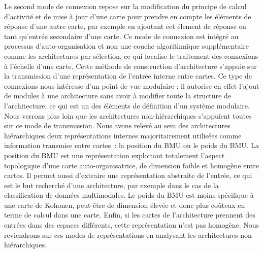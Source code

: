 \documentclass[../main]{subfiles}
\begin{document}
Le second mode de connexion repose sur la modification du principe de calcul d'activité et de mise à jour d'une carte pour prendre en compte les éléments de réponse d'une autre carte, par exemple en ajoutant cet élement de réponse en tant qu'entrée secondaire d'une carte.
Ce mode de connexion est intégré au processus d'auto-organisation et non une couche algorithmique supplémentaire comme les architectures par sélection, ce qui localise le traitement des connexions à l'échelle d'une carte. 
Cette méthode de construction d'architecture s'appuie sur la transmission d'une représentation de l'entrée interne entre cartes.
Ce type de connexions nous intéresse d'un point de vue modulaire : il autorise en effet l'ajout de modules à une architecture sans avoir à modifier toute la structure de l'architecture, ce qui est un des éléments de définition d'un système modulaire.
Nous verrons plus loin que les architectures non-hiérarchiques s'appuient toutes sur ce mode de transmission.
Nous avons relevé au sein des architectures hiérarchiques deux représentations internes majoritairement utilisées comme information transmise entre cartes~: la position du BMU ou le poids du BMU. La position du BMU est une représentation exploitant totalement l'aspect topologique d'une carte auto-organisatrice, de dimension faible et homogène entre cartes. Il permet aussi d'extraire une représentation abstraite de l'entrée, ce qui est le but recherché d'une architecture, par exemple dans le cas de la classification de données multimodales.
Le poids du BMU est moins spécifique à une carte de Kohonen, peut-être de dimension élevée et donc plus coûteux en terme de calcul dans une carte. Enfin, si les cartes de l'architecture prennent des entrées dans des espaces différents, cette représentation n'est pas homogène. 
Nous reviendrons sur ces modes de représentations en analysant les architectures non-hiérarchiques.
\end{document}
